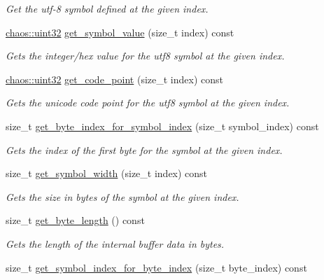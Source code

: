 \begin{DoxyCompactItemize}
\begin{DoxyCompactList}\small\item\em Get the utf-\/8 symbol defined at the given index. \end{DoxyCompactList}\item 
\hyperlink{namespacechaos_a3b3a47ba1e284655bf1a30c441121c60}{chaos\+::uint32} \hyperlink{classchaos_1_1str_1_1_u_t_f8_string_a1248ee0dde0ff8e028d162cefd67f034}{get\+\_\+symbol\+\_\+value} (size\+\_\+t index) const 
\begin{DoxyCompactList}\small\item\em Gets the integer/hex value for the utf8 symbol at the given index. \end{DoxyCompactList}\item 
\hyperlink{namespacechaos_a3b3a47ba1e284655bf1a30c441121c60}{chaos\+::uint32} \hyperlink{classchaos_1_1str_1_1_u_t_f8_string_a007889a60f57ec9196dcebb39abeafdf}{get\+\_\+code\+\_\+point} (size\+\_\+t index) const 
\begin{DoxyCompactList}\small\item\em Gets the unicode code point for the utf8 symbol at the given index. \end{DoxyCompactList}\item 
size\+\_\+t \hyperlink{classchaos_1_1str_1_1_u_t_f8_string_a4dddd9c6133754f5f424033ab28dc0e5}{get\+\_\+byte\+\_\+index\+\_\+for\+\_\+symbol\+\_\+index} (size\+\_\+t symbol\+\_\+index) const 
\begin{DoxyCompactList}\small\item\em Gets the index of the first byte for the symbol at the given index. \end{DoxyCompactList}\item 
\hypertarget{classchaos_1_1str_1_1_u_t_f8_string_a0c54a7cfaf4a3c1881b0c933c49a4922}{}size\+\_\+t \hyperlink{classchaos_1_1str_1_1_u_t_f8_string_a0c54a7cfaf4a3c1881b0c933c49a4922}{get\+\_\+symbol\+\_\+width} (size\+\_\+t index) const \label{classchaos_1_1str_1_1_u_t_f8_string_a0c54a7cfaf4a3c1881b0c933c49a4922}

\begin{DoxyCompactList}\small\item\em Gets the size in bytes of the symbol at the given index. \end{DoxyCompactList}\item 
size\+\_\+t \hyperlink{classchaos_1_1str_1_1_u_t_f8_string_a9312a6aac333d68a87066d6f222d119a}{get\+\_\+byte\+\_\+length} () const 
\begin{DoxyCompactList}\small\item\em Gets the length of the internal buffer data in bytes. \end{DoxyCompactList}\item 
\hypertarget{classchaos_1_1str_1_1_u_t_f8_string_aa005c8b0243343ec7308d00fa6e72846}{}size\+\_\+t \hyperlink{classchaos_1_1str_1_1_u_t_f8_string_aa005c8b0243343ec7308d00fa6e72846}{get\+\_\+symbol\+\_\+index\+\_\+for\+\_\+byte\+\_\+index} (size\+\_\+t byte\+\_\+index) const \label{classchaos_1_1str_1_1_u_t_f8_string_aa005c8b0243343ec7308d00fa6e72846}


\end{DoxyCompactItemize}
